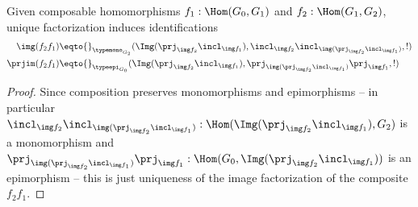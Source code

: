 \begin{lemma}
  Given composable homomorphisms $f_1:\Hom(G_0,G_1)$ and $f_2:\Hom(G_1,G_2)$, unique factorization induces identifications
  \begin{align*}
    \img(f_2f_1)&\eqto{}_{\typemono_{G_2}}(\Img(\prj_{\img f_2}\incl_{\img f_1}),\incl_{\img f_2}\incl_{\img(\prj_{\img f_2}\incl_{\img f_1})},!)\\
    \prjim(f_2f_1)&\eqto{}_{\typeepi_{G_0}}(\Img(\prj_{\img f_2}\incl_{\img f_1}),
  \prj_{\img(\prj_{\img f_2}\incl_{\img f_1})}\prj_{\img f_1},!)\\%
  \end{align*}
  
  
\end{lemma}
\begin{proof}
  Since composition preserves monomorphisms and epimorphisms
  -- in particular
  $\incl_{\img f_2} \incl_{\img(\prj_{\img f_2}\incl_{\img f_1})}:\Hom(\Img(\prj_{\img f_2}\incl_{\img f_1}),G_2)$ is a monomorphism and
  $\prj_{\img(\prj_{\img f_2}\incl_{\img f_1})} \prj_{\img f_1}:\Hom(G_0,\Img(\prj_{\img f_2}\incl_{\img f_1}))$ is an epimorphism --
  this is just uniqueness of the image factorization of the composite $f_2f_1$.
\end{proof}


